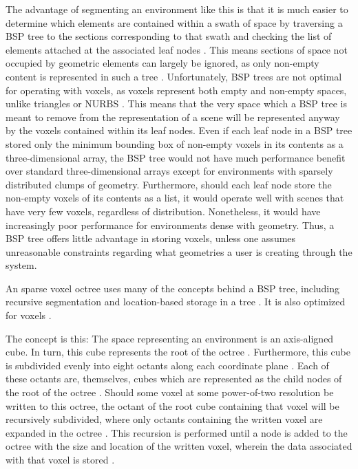 \documentclass[onecolumn, draftclsnofoot,10pt, compsoc]{IEEEtran}
\newcounter{threesection}[subsubsection]
\begin{document}
The advantage of segmenting an environment like this is that it is much easier to determine which elements are contained within a swath of space by traversing a BSP tree to the sections corresponding to that swath and checking the list of elements attached at the associated leaf nodes \cite{5}.
This means sections of space not occupied by geometric elements can largely be ignored, as only non-empty content is represented in such a tree \cite{5}.
Unfortunately, BSP trees are not optimal for operating with voxels, as voxels represent both empty and non-empty spaces, unlike triangles or NURBS \cite{1}.
This means that the very space which a BSP tree is meant to remove from the representation of a scene will be represented anyway by the voxels contained within its leaf nodes.
Even if each leaf node in a BSP tree stored only the minimum bounding box of non-empty voxels in its contents as a three-dimensional array, the BSP tree would not have much performance benefit over standard three-dimensional arrays except for environments with sparsely distributed clumps of geometry.
Furthermore, should each leaf node store the non-empty voxels of its contents as a list, it would operate well with scenes that have very few voxels, regardless of distribution. Nonetheless, it would have increasingly poor performance for environments dense with geometry. 
Thus, a BSP tree offers little advantage in storing voxels, unless one assumes unreasonable constraints regarding what geometries a user is creating through the system.



An sparse voxel octree uses many of the concepts behind a BSP tree, including recursive segmentation and location-based storage in a tree \cite{3}.
It is also optimized for voxels \cite{3}.

The concept is this: The space representing an environment is an axis-aligned cube. In turn, this cube represents the root of the octree \cite{3}.
Furthermore, this cube is subdivided evenly into eight octants along each coordinate plane \cite{3}.
Each of these octants are, themselves, cubes which are represented as the child nodes of the root of the octree \cite{3}.
Should some voxel at some power-of-two resolution be written to this octree, the octant of the root cube containing that voxel will be recursively subdivided, where only octants containing the written voxel are expanded in the octree \cite{3}. 
This recursion is performed until a node is added to the octree with the size and location of the written voxel, wherein the data associated with that voxel is stored \cite{3}.
\end{document}
